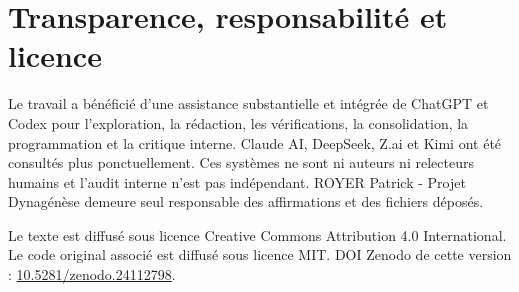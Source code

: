 \documentclass[11pt,a4paper]{article}
\begin{document}
\tableofcontents
\clearpage
{}



\section*{Transparence, responsabilité et licence}
Le travail a bénéficié d’une assistance substantielle et intégrée de ChatGPT
et Codex pour l’exploration, la rédaction, les vérifications, la
consolidation, la programmation et la critique interne. Claude AI, DeepSeek,
Z.ai et Kimi ont été consultés plus ponctuellement. Ces systèmes ne sont ni
auteurs ni relecteurs humains et l’audit interne n’est pas indépendant. ROYER
Patrick - Projet Dynagénèse demeure seul responsable des affirmations et des
fichiers déposés.

Le texte est diffusé sous licence Creative Commons Attribution 4.0
International. Le code original associé est diffusé sous licence MIT. DOI
Zenodo de cette version :
\href{https://doi.org/10.5281/zenodo.24112798}{10.5281/zenodo.24112798}.
\end{document}
